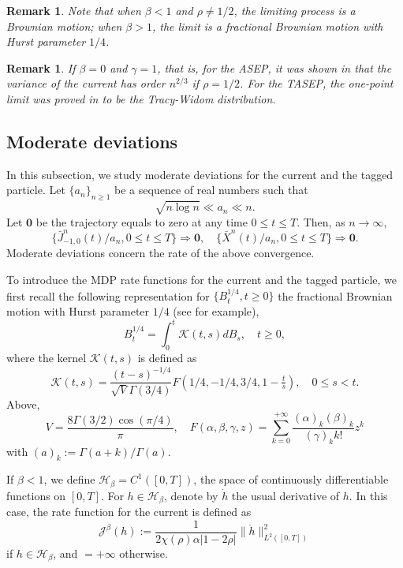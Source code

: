 \documentclass[reqno,11pt]{amsart}
\numberwithin{equation}{section}
\newtheorem{remark}[theorem]{Remark}
\begin{document}
\begin{remark}
Note that when $\beta < 1$ and $\rho \neq 1/2$, the limiting process  is a  Brownian motion; when $\beta > 1$, the limit is a  fractional Brownian motion with Hurst parameter $1/4$.
\end{remark}

\begin{remark}
If $\beta=0$ and $\gamma = 1$, that is, for the ASEP, it was shown in \cite{balazs2010order} that  the variance of the current has order $n^{2/3}$ if $\rho = 1/2$.  For the TASEP, the one-point limit was proved in \cite{Johansson00} to be the Tracy-Widom distribution.
\end{remark}

\subsection{Moderate deviations}  In this subsection, we study moderate deviations for the current and the tagged particle.  
Let $\{a_n\}_{n \geq 1}$ be a sequence of real numbers such that \[\sqrt{n \log n} \ll a_n \ll n.\]  
Let $\mathbf{0}$ be the trajectory equals to zero at any time $0 \leq t \leq T$. Then, as $n \rightarrow \infty$,
\[\{\bar{J}^n_{-1,0} (t)/a_n, 0 \leq t \leq T \} \Rightarrow \mathbf{0}, \quad \{\bar{X}^n (t)/a_n, 0 \leq t \leq T \} \Rightarrow \mathbf{0}.\]
Moderate deviations concern the rate of the above convergence.

To introduce the MDP rate functions for the current and the tagged particle, we first recall the following  representation for $\{B_t^{1/4}, t \geq 0\}$ the fractional Brownian motion with Hurst parameter $1/4$ (see \cite{Decreu1999FBM} for example),
\[B_t^{1/4} = \int_0^t \mathcal{K} (t,s) d B_s, \quad t \geq 0,\]
where the kernel $ \mathcal{K} (t,s)$ is defined as
\[
\mathcal{K}(t,s)=\frac{(t-s)^{-1/4}}{\sqrt{V}\Gamma(3/4)}F(1/4, -1/4, 3/4, 1-\tfrac{t}{s}), \quad 0\leq s<t.
\]
Above, 
\[
V=\frac{8\Gamma(3/2)\cos(\pi/4)}{\pi}, \quad 
F(\alpha,\beta,\gamma,z)=\sum_{k=0}^{+\infty}\frac{(\alpha)_k(\beta)_k}{(\gamma)_kk!}z^k
\]
with $(a)_k := \Gamma(a+k)/\Gamma(a)$. 

If $\beta < 1$, we define $\mathcal{H}_\beta = C^1 ([0,T])$, the space of continuously differentiable functions on $[0,T]$. For $h \in \mathcal{H}_\beta$, denote by $\dot{h}$ the usual derivative of $h$.  In this case, the rate function for the current is defined as
	\[\mathcal{J}^\beta (h):= 
\frac{1}{2 \chi(\rho) \alpha |1-2\rho|}  \|\dot{h}\|_{L^2 ([0,T])}^2 \]
if $h \in \mathcal{H}_\beta$, and $= + \infty$ otherwise.
\end{document}

